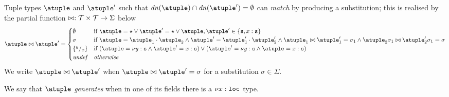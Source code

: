 \smallskip
Tuple types $\atuple$ and $\atuple'$ such that
$\dn{\atuple}\cap\dn{\atuple'} = \emptyset$
can \emph{match} by producing a substitution;
this is realised by the partial function
$\matches : \tupleset \times \tupleset \to \Sigma$ below
\[
  \atuple \matches \atuple' \generates
    \begin{cases}
     \emptyset
    & 
    \text{if  } \atuple = \wildcard \vee \atuple' = \wildcard  \vee 
    \atuple,\atuple'\in\{\asort, x : \asort\}
    \\
    \sigma
    &
    \text{if } \atuple = \atuple_1 \cdot \atuple_2
    \land  \atuple' = \atuple'_1 \cdot \atuple'_2
    \land \atuple_1 \matches \atuple'_1 \generates \sigma_1
    \land \atuple_2\sigma_1 \matches \atuple'_2\sigma_1 \generates \sigma
    \\
    \sust x y 
    &
    \text{if  } (\atuple = \nu y : \asort \land \atuple' = x: \asort) \vee  (\atuple' = \nu y : \asort \land \atuple = x: \asort) 
    \\
    \textit{undef} & \textit{otherwise}
   \end{cases}
\]
%
We write $\atuple \matches \atuple'$ when
$\atuple \matches \atuple' = \sigma$ for a substitution
$\sigma \in \Sigma$.
%
%
%

\smallskip
We say that $\atuple$ \emph{generates} when in one of its fields there
is a $\nu x: \asort[loc]$ type. 
%

%


